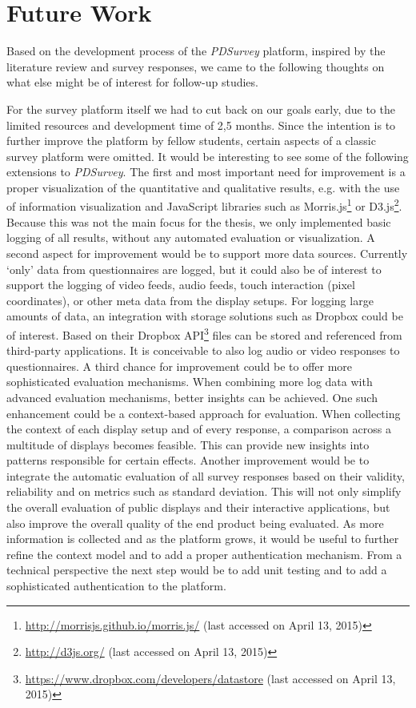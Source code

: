 \section{Future Work}
\label{chapter:future-work}


Based on the development process of the \textit{PDSurvey} platform, inspired by the literature review and survey responses, we came to the following thoughts on what else might be of interest for follow-up studies.


For the survey platform itself we had to cut back on our goals early, due to the limited resources and development time of 2,5 months. Since the intention is to further improve the platform by fellow students, certain aspects of a classic survey platform were omitted. It would be interesting to see some of the following extensions to \textit{PDSurvey}.
The first and most important need for improvement is a proper visualization of the quantitative and qualitative results, e.g. with the use of information visualization and JavaScript libraries such as Morris.js\footnote{\url{http://morrisjs.github.io/morris.js/} (last accessed on April 13, 2015)} or D3.js\footnote{\url{http://d3js.org/} (last accessed on April 13, 2015)}. Because this was not the main focus for the thesis, we only implemented basic logging of all results, without any automated evaluation or visualization.
A second aspect for improvement would be to support more data sources. Currently `only' data from questionnaires are logged, but it could also be of interest to support the logging of video feeds, audio feeds, touch interaction (pixel coordinates), or other meta data from the display setups. For logging large amounts of data, an integration with storage solutions such as Dropbox could be of interest. Based on their Dropbox API\footnote{\url{https://www.dropbox.com/developers/datastore} (last accessed on April 13, 2015)} files can be stored and referenced from third-party applications. It is conceivable to also log audio or video responses to questionnaires.
A third chance for improvement could be to offer more sophisticated evaluation mechanisms. When combining more log data with advanced evaluation mechanisms, better insights can be achieved. One such enhancement could be a context-based approach for evaluation. When collecting the context of each display setup and of every response, a comparison across a multitude of displays becomes feasible. This can provide new insights into patterns responsible for certain effects. Another improvement would be to integrate the automatic evaluation of all survey responses based on their validity, reliability and on metrics such as standard deviation. This will not only simplify the overall evaluation of public displays and their interactive applications, but also improve the overall quality of the end product being evaluated.
As more information is collected and as the platform grows, it would be useful to further refine the context model and to add a proper authentication mechanism. From a technical perspective the next step would be to add unit testing and to add a sophisticated authentication to the platform.



